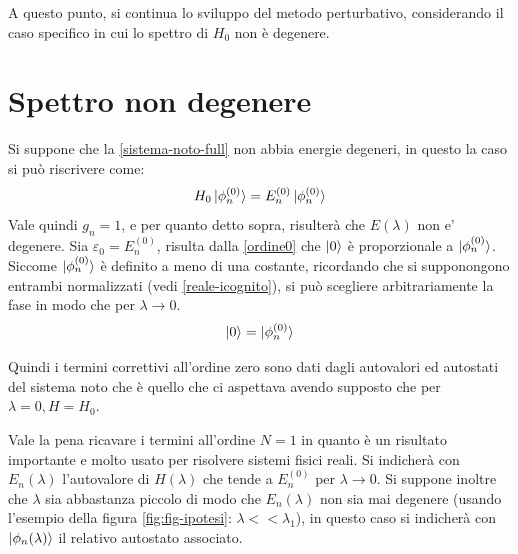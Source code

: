 \documentclass[a4paper, 10pt]{article}
\newcommand{\reff}[1]{\mbox{\ref{#1}}}
\begin{document}
A questo punto, si continua lo sviluppo del metodo perturbativo, considerando il caso specifico in cui lo spettro di $H_0$ non è degenere.

\section{Spettro non degenere}
Si suppone che la \reff{sistema-noto-full} non abbia energie degeneri, in questo la caso si può riscrivere come:
\begin{equation}
	\label{noto-non-degenere}
	H_0\ket{\phi_{n}^{(0)}} = E_n^{(0)}\ket{\phi_{n}^{(0)}}
\end{equation}
Vale quindi $g_n = 1$, e per quanto detto sopra, risulterà che $E(\lambda)$ non e' degenere. Sia $\varepsilon_0 = E_n^{(0)}$, risulta dalla \reff{ordine0} che $\ket{0}$ è proporzionale a $\ket{\phi_n^{(0)}}$. Siccome $\ket{\phi_n^{(0)}}$ è definito a meno di una costante, ricordando che si supponongono entrambi normalizzati (vedi \reff{reale-icognito}), si può scegliere arbitrariamente la fase in modo che per $\lambda \to 0$.
\begin{equation}
	\label{espressione-stato0}
	\ket{0} = \ket{\phi_n^{(0)}}
\end{equation}

Quindi i termini correttivi all'ordine zero sono dati dagli autovalori ed autostati del sistema noto che è quello che ci aspettava avendo supposto che per $\lambda = 0, H = H_0$.

Vale la pena ricavare i termini all'ordine $N = 1$ in quanto è un risultato importante e molto usato per risolvere sistemi fisici reali. Si indicherà con $E_n(\lambda)$ l'autovalore di $H(\lambda)$ che tende a $E_n^{(0)}$ per $\lambda \to 0$. Si suppone inoltre che $\lambda$ sia abbastanza piccolo di modo che $E_n(\lambda)$ non sia mai degenere (usando l'esempio della figura \reff{fig:fig-ipotesi}: $\lambda << \lambda_1$), in questo caso si indicherà con $\ket{\phi_n(\lambda)}$ il relativo autostato associato.
\end{document}
